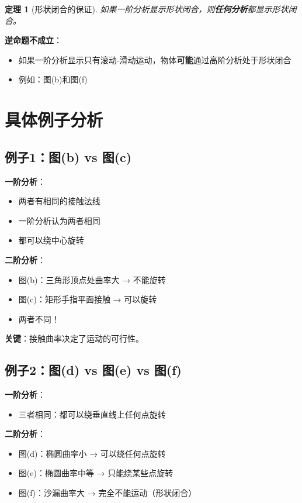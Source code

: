 \documentclass[12pt,a4paper]{article}
\newtheorem{theorem}{定理}
\begin{document}
\begin{theorem}[形状闭合的保证]
如果一阶分析显示形状闭合，则\textbf{任何分析}都显示形状闭合。
\end{theorem}

\textbf{逆命题不成立}：
\begin{itemize}
\item 如果一阶分析显示只有滚动-滑动运动，物体\textbf{可能}通过高阶分析处于形状闭合
\item 例如：图(b)和图(f)
\end{itemize}

\section{具体例子分析}

\subsection{例子1：图(b) vs 图(c)}

\textbf{一阶分析}：
\begin{itemize}
\item 两者有相同的接触法线
\item 一阶分析认为两者相同
\item 都可以绕中心旋转
\end{itemize}

\textbf{二阶分析}：
\begin{itemize}
\item 图(b)：三角形顶点处曲率大 → 不能旋转
\item 图(c)：矩形手指平面接触 → 可以旋转
\item 两者不同！
\end{itemize}

\textbf{关键}：接触曲率决定了运动的可行性。

\subsection{例子2：图(d) vs 图(e) vs 图(f)}

\textbf{一阶分析}：
\begin{itemize}
\item 三者相同：都可以绕垂直线上任何点旋转
\end{itemize}

\textbf{二阶分析}：
\begin{itemize}
\item 图(d)：椭圆曲率小 → 可以绕任何点旋转
\item 图(e)：椭圆曲率中等 → 只能绕某些点旋转
\item 图(f)：沙漏曲率大 → 完全不能运动（形状闭合）
\end{itemize}
\end{document}
